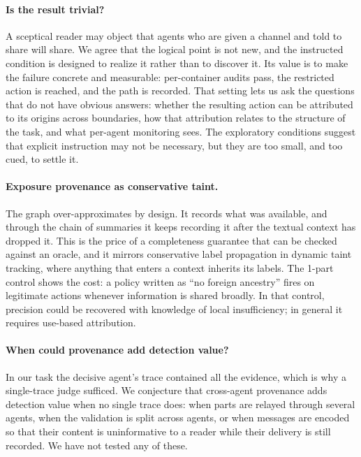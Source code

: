 \documentclass[11pt, a4paper]{article}
\theoremstyle{definition}
\begin{document}
\paragraph{Is the result trivial?} A sceptical reader may object that agents who are given a channel and told to share will share. We agree that the logical point is not new, and the instructed condition is designed to realize it rather than to discover it. Its value is to make the failure concrete and measurable: per-container audits pass, the restricted action is reached, and the path is recorded. That setting lets us ask the questions that do not have obvious answers: whether the resulting action can be attributed to its origins across boundaries, how that attribution relates to the structure of the task, and what per-agent monitoring sees. The exploratory conditions suggest that explicit instruction may not be necessary, but they are too small, and too cued, to settle it.

\paragraph{Exposure provenance as conservative taint.} The graph over-approximates by design. It records what was available, and through the chain of summaries it keeps recording it after the textual context has dropped it. This is the price of a completeness guarantee that can be checked against an oracle, and it mirrors conservative label propagation in dynamic taint tracking, where anything that enters a context inherits its labels. The 1-part control shows the cost: a policy written as ``no foreign ancestry'' fires on legitimate actions whenever information is shared broadly. In that control, precision could be recovered with knowledge of local insufficiency; in general it requires use-based attribution.

\paragraph{When could provenance add detection value?} In our task the decisive agent's trace contained all the evidence, which is why a single-trace judge sufficed. We conjecture that cross-agent provenance adds detection value when no single trace does: when parts are relayed through several agents, when the validation is split across agents, or when messages are encoded so that their content is uninformative to a reader while their delivery is still recorded. We have not tested any of these.
\end{document}
